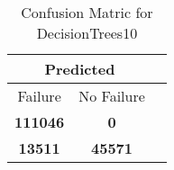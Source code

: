 \begin{table}[] 
\caption{Confusion Matric for DecisionTrees10} 
\label{Table: Prediction Accuracy-DMDDecisionTrees10OnlySunEKF-combinationReflectionperfectNoFailurePrediction-Reflection} 
\centering 
\begin{tabular} 
 {@{}ccc@{}} 
\toprule 
\multicolumn{2}{c}{\textbf{Predicted}}
 \\ \midrule 
\multicolumn{1}{|c|}{Failure} & 
\multicolumn{1}{c|}{No Failure}
 \\ \midrule 
\multicolumn{1}{|c|}{\color{green}\textbf{111046}} & 
\multicolumn{1}{c|}{\color{red}\textbf{0}}
 \\ \midrule 
\multicolumn{1}{|c|}{\color{red}\textbf{13511}} & 
\multicolumn{1}{c|}{\color{green}\textbf{45571}}
 \\ \bottomrule 
\end{tabular} 
\end{table} 
